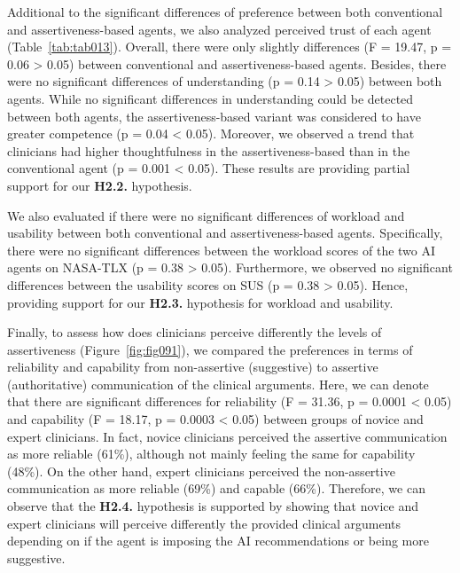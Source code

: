 Additional to the significant differences of preference between both conventional and assertiveness-based agents, we also analyzed perceived trust of each agent (Table~\ref{tab:tab013}).
Overall, there were only slightly differences (F = 19.47, p = 0.06 > 0.05) between conventional and assertiveness-based agents.
Besides, there were no significant differences of understanding (p = 0.14 > 0.05) between both agents.
While no significant differences in understanding could be detected between both agents, the assertiveness-based variant was considered to have greater competence (p = 0.04 < 0.05).
Moreover, we observed a trend that clinicians had higher thoughtfulness in the assertiveness-based than in the conventional agent (p = 0.001 < 0.05).
These results are providing partial support for our {\bf H2.2.} hypothesis.

We also evaluated if there were no significant differences of workload and usability between both conventional and assertiveness-based agents.
Specifically, there were no significant differences between the workload scores of the two AI agents on NASA-TLX (p = 0.38 > 0.05).
Furthermore, we observed no significant differences between the usability scores on SUS (p = 0.38 > 0.05).
Hence, providing support for our {\bf H2.3.} hypothesis for workload and usability.



Finally, to assess how does clinicians perceive differently the levels of assertiveness (Figure~\ref{fig:fig091}), we compared the preferences in terms of reliability and capability from non-assertive (suggestive) to assertive (authoritative) communication of the clinical arguments.
Here, we can denote that there are significant differences for reliability (F = 31.36, p = 0.0001 < 0.05) and capability (F = 18.17, p = 0.0003 < 0.05) between groups of novice and expert clinicians.
In fact, novice clinicians perceived the assertive communication as more reliable (61\%), although not mainly feeling the same for capability (48\%).
On the other hand, expert clinicians perceived the non-assertive communication as more reliable (69\%) and capable (66\%).
Therefore, we can observe that the {\bf H2.4.} hypothesis is supported by showing that novice and expert clinicians will perceive differently the provided clinical arguments depending on if the agent is imposing the AI recommendations or being more suggestive.

